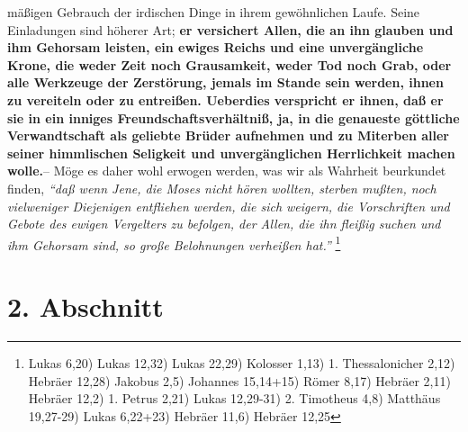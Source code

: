 mäßigen Gebrauch der irdischen Dinge in ihrem gewöhnlichen Laufe. Seine
Einladungen sind höherer Art;
\textbf{er versichert Allen, die an ihn glauben und ihm
Gehorsam leisten, ein ewiges Reichs und eine unvergängliche Krone, die weder
Zeit noch Grausamkeit, weder Tod noch Grab, oder alle Werkzeuge der Zerstörung,
jemals im Stande sein werden, ihnen zu vereiteln oder zu entreißen. Ueberdies
verspricht er ihnen, daß er sie in ein inniges Freundschaftsverhältniß, ja, in
die genaueste göttliche Verwandtschaft als geliebte Brüder aufnehmen und zu
Miterben aller seiner himmlischen Seligkeit und unvergänglichen Herrlichkeit
machen wolle.}-- Möge es daher wohl erwogen werden, was wir als Wahrheit
beurkundet finden,
\textit{"`daß wenn Jene, die Moses nicht hören wollten, sterben
mußten, noch vielweniger Diejenigen entfliehen werden, die sich weigern, die
Vorschriften und Gebote des ewigen Vergelters zu befolgen, der Allen, die ihn
fleißig suchen und ihm Gehorsam sind, so große Belohnungen verheißen
hat."'}
\footnote{
Lukas 6,20) 
Lukas 12,32) 
Lukas 22,29) 
Kolosser 1,13)
1. Thessalonicher 2,12) 
Hebräer 12,28) 
Jakobus 2,5) 
Johannes 15,14+15) 
Römer 8,17) 
Hebräer 2,11) 
Hebräer 12,2) 
1. Petrus 2,21) 
Lukas 12,29-31) 
2. Timotheus 4,8) 
Matthäus 19,27-29) 
Lukas 6,22+23)
Hebräer 11,6) 
Hebräer 12,25}

\section{2. Abschnitt} \label{kap16_ab2}

